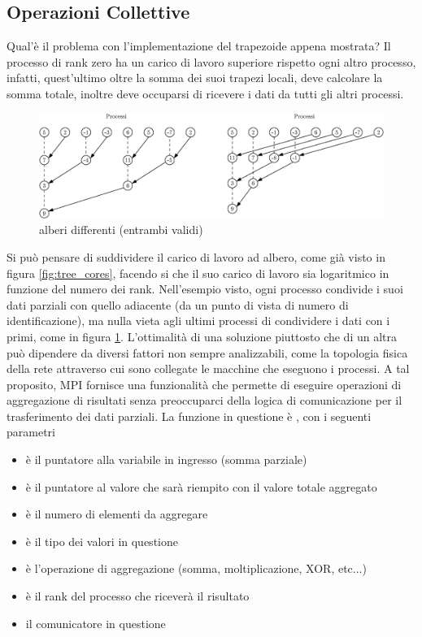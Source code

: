 \documentclass[10pt, letterpaper]{report}
\begin{document}
\subsection{Operazioni Collettive}
Qual'è il problema con l'implementazione del trapezoide appena mostrata? Il processo di rank zero ha un carico di lavoro superiore 
rispetto ogni altro processo, infatti, quest'ultimo oltre la somma dei suoi trapezi locali, deve calcolare 
la somma totale, inoltre deve occuparsi di ricevere i dati da tutti gli altri processi. 
\begin{figure}[h!]
    \centering
    \includegraphics[width=450pt]{images/tree2.eps}
    \caption{alberi differenti (entrambi validi)}
    \label{fig:tree_cores2}
\end{figure}\acc
Si può pensare di 
suddividere il carico di lavoro ad albero, come già visto in figura 
\ref{fig:tree_cores}, facendo si che il suo carico di lavoro sia logaritmico in funzione del numero dei rank. 
Nell'esempio visto, ogni processo condivide i suoi dati parziali con quello adiacente (da un punto di vista 
di numero di identificazione), ma nulla vieta agli ultimi processi di condividere i dati con i primi, come in figura 
\ref{fig:tree_cores2}.
L'ottimalità di una soluzione piuttosto che di un altra può dipendere da diversi fattori non sempre analizzabili, come 
la topologia fisica della rete attraverso cui sono collegate le macchine che eseguono i processi.\acc 
A tal proposito, MPI fornisce una funzionalità che permette di eseguire operazioni di aggregazione di risultati 
senza preoccuparci della logica di comunicazione per il trasferimento dei dati parziali. La funzione in questione è 
, con i seguenti parametri
\begin{itemize}
    \item {} è il puntatore alla variabile in ingresso (somma parziale)
    \item {} è il puntatore al valore che sarà riempito con il valore totale aggregato
    \item {} è il numero di elementi da aggregare
    \item {} è il tipo dei valori in questione
    \item {} è l'operazione di aggregazione (somma, moltiplicazione, XOR, etc...) 
    \item {} è il rank del processo che riceverà il risultato
    \item {} il comunicatore in questione
\end{itemize}
\end{document}

